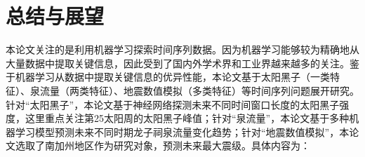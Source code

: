 \chapter{总结与展望}\label{chap:conclusion}


本论文关注的是利用机器学习探索时间序列数据。因为机器学习能够较为精确地从大量数据中提取关键信息，因此受到了国内外学术界和工业界越来越多的关注。鉴于机器学习从数据中提取关键信息的优异性能，本论文基于太阳黑子（一类特征）、泉流量（两类特征）、地震数值模拟（多类特征）等时间序列问题展开研究。针对“太阳黑子”，本论文基于神经网络探测未来不同时间窗口长度的太阳黑子强度，这里重点关注第25太阳周的太阳黑子峰值；针对“泉流量”，本论文基于多种机器学习模型预测未来不同时期龙子祠泉流量变化趋势；针对“地震数值模拟”，本论文选取了南加州地区作为研究对象，预测未来最大震级。具体内容为：
